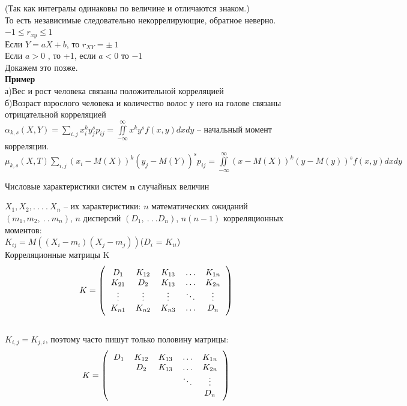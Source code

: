 \documentclass[russian, 12pt, fleqn,x11names]{article}
\begin{document}
(Так как интегралы одинаковы по величине и отличаются знаком.)\\	
То есть независимые следовательно некоррелирующие, обратное неверно.\\
$-1\leq r_{xy} \leq 1$\\
Если $Y=aX+b$, то $r_{XY} = \pm \ 1$\\
Если $a>0$   , то +1, если $a<0$ то $-1$\\
Докажем это позже.\\
\textbf{Пример}\\
а)Вес и рост человека связаны положительной корреляцией\\
б)Возраст взрослого человека и количество волос у него на голове связаны отрицательной корреляцией\\
$\alpha_{k,s} (X,Y) = \sum\limits_{i, j} x_i^k y_j^s p_{ij} =  \displaystyle{\iint\limits_{-\infty}^{\infty}} x^k y^s f(x, y) dx dy  $ -- начальный момент корреляции.\\ 
$\mu_{k,s}(X, T)  \sum\limits_{i, j} (x_i - M(X))^k (y_j - M(Y))^s p_{i j} = \displaystyle{\iint\limits_{-\infty}^{\infty}}(x-M(X))^k(y-M(y))^s f(x, y) dxdy$
\begin{center}
$\textbf{Числовые характеристики систем n случайных величин}$
\end{center}
$X_1, X_2, .\ .\ .\ .\ X_n$ -- их характеристики: $n$ математических ожиданий $(m_1, m_2, \ .\ . \  m_n)$, $n$ дисперсий $(D_1, \ .\ .\ . D_n)$,  $n(n-1)$ корреляционных моментов:\\
$K_{ij} = M((X_i - m_i)(X_j - m_j))$($D_i$ = $K_{ii}$)\\
Корреляционные матрицы K
$$
K=\left(\begin{tabular}{c c c c c}
\(D_1\) & \(K_{12}\) & \(K_{13}\) & \(\ldots\) & \(K_{1n}\) \\
\(K_{21}\) &\( D_2\) & \(K_{13}\) & \(\ldots\) &\( K_{2n}\)\\
\(\vdots\) & \(\vdots\) & \(\vdots\) & \(\ddots\) & \(\vdots\) \\
\(K_{n1}\)& \(K_{n2}\) &\( K_{n3}\) & \(\ldots\) & \(D_n\)\\	
\end{tabular}\right)$$\\
$K_{i, j} = K_{j, i}$, поэтому часто пишут только половину матрицы:\\

$$
K=\left(\begin{tabular}{c c c c c}
\(D_1\) & \(K_{12}\) & \(K_{13}\) & \(\ldots\) & \(K_{1n}\) \\
 &\( D_2\) & \(K_{13}\) & \(\ldots\) &\( K_{2n}\)\\
 &  &  & \(\ddots\) & \(\vdots\) \\
 &  & & & \(D_n\)\\	
\end{tabular}\right)$$\\
\end{document}

